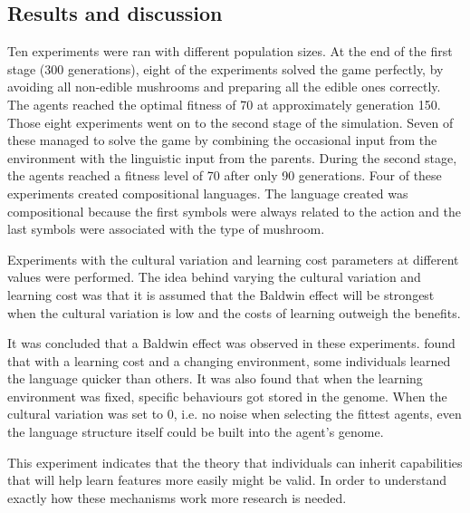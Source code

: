 \subsection{Results and discussion}
Ten experiments were ran with different population sizes. At the end of the first stage (300 generations), eight of the experiments solved the game perfectly, by avoiding all non-edible mushrooms and preparing all the edible ones correctly. The agents reached the optimal fitness of 70 at approximately generation 150.
Those eight experiments went on to the second stage of the simulation. Seven of these managed to solve the game by combining the occasional input from the environment with the linguistic input from the parents. During the second stage, the agents reached a fitness level of 70 after only 90 generations. 
Four of these experiments created compositional languages. The language created was compositional because the first symbols were always related to the action and the last symbols were associated with the type of mushroom.

Experiments with the cultural variation and learning cost parameters at different values were performed. The idea behind varying the cultural variation and learning cost was that it is assumed that the Baldwin effect will be strongest when the cultural variation is low and the costs of learning outweigh the benefits.

It was concluded that a Baldwin effect was observed in these experiments. \citeauthor{munroe2002learning} found that with a learning cost and a changing environment, some individuals learned the language quicker than others. It was also found that when the learning environment was fixed, specific behaviours got stored in the genome. When the cultural variation was set to 0, i.e. no noise when selecting the fittest agents, even the language structure itself could be built into the agent's genome.

This experiment indicates that the theory that individuals can inherit capabilities that will help learn features more easily might be valid. In order to understand exactly how these mechanisms work more research is needed.

